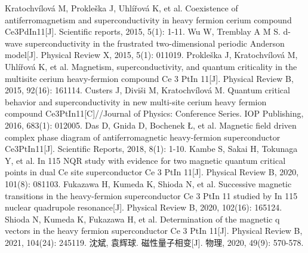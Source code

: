 \begin{thebibliography}{20}
 Kratochvílová M, Prokleška J, Uhlířová K, et al. Coexistence of antiferromagnetism and superconductivity in heavy fermion cerium compound Ce3PdIn11[J]. Scientific reports, 2015, 5(1): 1-11.
 Wu W, Tremblay A M S. d-wave superconductivity in the frustrated two-dimensional periodic Anderson model[J]. Physical Review X, 2015, 5(1): 011019.
 Prokleška J, Kratochvílová M, Uhlířová K, et al. Magnetism, superconductivity, and quantum criticality in the multisite cerium heavy-fermion compound Ce 3 PtIn 11[J]. Physical Review B, 2015, 92(16): 161114.
 Custers J, Diviši M, Kratochvílová M. Quantum critical behavior and superconductivity in new multi-site cerium heavy fermion compound Ce3PtIn11[C]//Journal of Physics: Conference Series. IOP Publishing, 2016, 683(1): 012005.
 Das D, Gnida D, Bochenek Ł, et al. Magnetic field driven complex phase diagram of antiferromagnetic heavy-fermion superconductor Ce3PtIn11[J]. Scientific Reports, 2018, 8(1): 1-10.
 Kambe S, Sakai H, Tokunaga Y, et al. In 115 NQR study with evidence for two magnetic quantum critical points in dual Ce site superconductor Ce 3 PtIn 11[J]. Physical Review B, 2020, 101(8): 081103.
 Fukazawa H, Kumeda K, Shioda N, et al. Successive magnetic transitions in the heavy-fermion superconductor Ce 3 PtIn 11 studied by In 115 nuclear quadrupole resonance[J]. Physical Review B, 2020, 102(16): 165124.
 Shioda N, Kumeda K, Fukazawa H, et al. Determination of the magnetic q vectors in the heavy fermion superconductor Ce 3 PtIn 11[J]. Physical Review B, 2021, 104(24): 245119.
 沈斌, 袁辉球. 磁性量子相变[J]. 物理, 2020, 49(9): 570-578.
\end{thebibliography}
